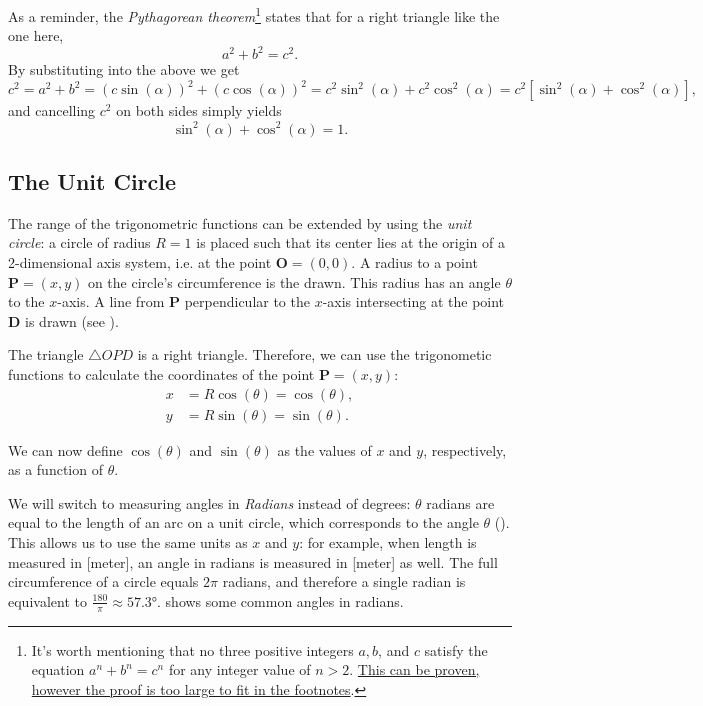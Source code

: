 As a reminder, the \emph{Pythagorean theorem}\footnote{It's worth mentioning that no three positive integers $a, b$, and $c$ satisfy the equation $a^{n}+b^{n}=c^{n}$ for any integer value of $n>2$. \href{https://en.wikipedia.org/wiki/Fermat\%27s_Last_Theorem}{This can be proven, however the proof is too large to fit in the footnotes}.} states that for a right triangle like the one here,
\begin{equation}
	a^{2} + b^{2} = c^{2}.
	\label{eq:pythagorean_theorem}
\end{equation}
By substituting  into the above we get
\begin{equation*}
	c^{2} = a^{2}+b^{2} = \left( c\sin(\alpha) \right)^{2} + \left( c\cos(\alpha) \right)^{2} = c^{2}\sin^{2}(\alpha) + c^{2}\cos^{2}(\alpha) = c^{2}\left[ \sin^{2}(\alpha) + \cos^{2}(\alpha) \right],
\end{equation*}
and cancelling $c^{2}$ on both sides simply yields
\begin{equation}
	\sin^{2}(\alpha) + \cos^{2}(\alpha) = 1.
	\label{eq:sin2_cos2_1}
\end{equation}

\subsection{The Unit Circle}
The range of the trigonometric functions can be extended by using the \emph{unit circle}: a circle of radius $R=1$ is placed such that its center lies at the origin of a 2-dimensional axis system, i.e. at the point $\bm{O}=(0,0)$. A radius to a point $\bm{P}=(x,y)$ on the circle's circumference is the drawn. This radius has an angle $\theta$ to the $x$-axis. A line from $\bm{P}$ perpendicular to the $x$-axis intersecting at the point $\bm{D}$ is drawn (see ).

The triangle $\triangle OPD$ is a right triangle. Therefore, we can use the trigonometic functions to calculate the coordinates of the point $\bm{P}=(x,y)$:
\begin{align}
	x &= R\cos(\theta) = \cos(\theta),\nonumber\\
	y &= R\sin(\theta) = \sin(\theta).
	\label{eq:xy_P}
\end{align}

We can now define $\cos(\theta)$ and $\sin(\theta)$ as the values of $x$ and $y$, respectively, as a function of $\theta$.

We will switch to measuring angles in \emph{Radians} instead of degrees: $\theta$ radians are equal to the length of an arc on a unit circle, which corresponds to the angle $\theta$ (). This allows us to use the same units as $x$ and $y$: for example, when length is measured in [\si{meter}], an angle in radians is measured in [\si{meter}] as well. The full circumference of a circle equals $2\pi$ radians, and therefore a single radian is equivalent to $\frac{180}{\pi} \approx \ang{57.3}$.  shows some common angles in radians.

